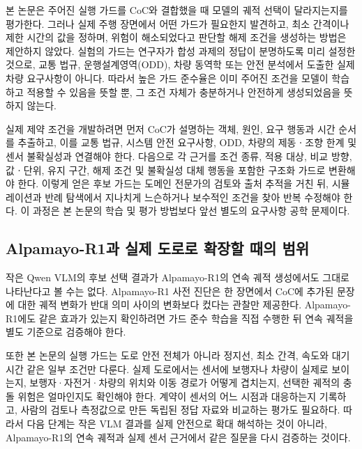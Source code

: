 본 논문은 주어진 실행 가드를 CoC와 결합했을 때 모델의 궤적 선택이 달라지는지를 평가한다. 그러나 실제 주행 장면에서 어떤 가드가 필요한지 발견하고, 최소 간격이나 제한 시간의 값을 정하며, 위험이 해소되었다고 판단할 해제 조건을 생성하는 방법은 제안하지 않았다. 실험의 가드는 연구자가 합성 과제의 정답이 분명하도록 미리 설정한 것으로, 교통 법규, 운행설계영역(ODD), 차량 동역학 또는 안전 분석에서 도출한 실제 차량 요구사항이 아니다. 따라서 높은 가드 준수율은 이미 주어진 조건을 모델이 학습하고 적용할 수 있음을 뜻할 뿐, 그 조건 자체가 충분하거나 안전하게 생성되었음을 뜻하지 않는다.

실제 제약 조건을 개발하려면 먼저 CoC가 설명하는 객체, 원인, 요구 행동과 시간 순서를 추출하고, 이를 교통 법규, 시스템 안전 요구사항, ODD, 차량의 제동ㆍ조향 한계 및 센서 불확실성과 연결해야 한다. 다음으로 각 근거를 조건 종류, 적용 대상, 비교 방향, 값ㆍ단위, 유지 구간, 해제 조건 및 불확실성 대체 행동을 포함한 구조화 가드로 변환해야 한다. 이렇게 얻은 후보 가드는 도메인 전문가의 검토와 출처 추적을 거친 뒤, 시뮬레이션과 반례 탐색에서 지나치게 느슨하거나 보수적인 조건을 찾아 반복 수정해야 한다. 이 과정은 본 논문의 학습 및 평가 방법보다 앞선 별도의 요구사항 공학 문제이다.

\subsection{Alpamayo-R1과 실제 도로로 확장할 때의 범위}

작은 Qwen VLM의 후보 선택 결과가 Alpamayo-R1의 연속 궤적 생성에서도 그대로 나타난다고 볼 수는 없다. Alpamayo-R1 사전 진단은 한 장면에서 CoC에 추가된 문장에 대한 궤적 변화가 반대 의미 사이의 변화보다 컸다는 관찰만 제공한다. Alpamayo-R1에도 같은 효과가 있는지 확인하려면 가드 준수 학습을 직접 수행한 뒤 연속 궤적을 별도 기준으로 검증해야 한다.

또한 본 논문의 실행 가드는 도로 안전 전체가 아니라 정지선, 최소 간격, 속도와 대기시간 같은 일부 조건만 다룬다. 실제 도로에서는 센서에 보행자나 차량이 실제로 보이는지, 보행자·자전거·차량의 위치와 이동 경로가 어떻게 겹치는지, 선택한 궤적의 충돌 위험은 얼마인지도 확인해야 한다. 계약이 센서의 어느 시점과 대응하는지 기록하고, 사람의 검토나 측정값으로 만든 독립된 정답 자료와 비교하는 평가도 필요하다. 따라서 다음 단계는 작은 VLM 결과를 실제 안전으로 확대 해석하는 것이 아니라, Alpamayo-R1의 연속 궤적과 실제 센서 근거에서 같은 질문을 다시 검증하는 것이다.
